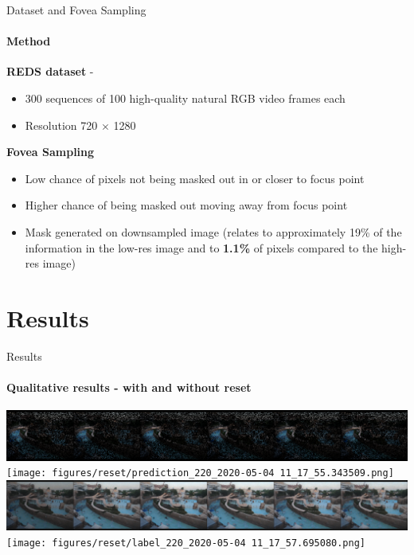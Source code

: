 \documentclass[
	ngerman,
	aspectratio=169,
	color={accentcolor=3d},
	logo=false,
	colorframetitle=true,
	]{tudabeamer}
\begin{document}
\begin{frame}{Dataset and Fovea Sampling}
\framesubtitle{Method}
\textbf{REDS dataset} - \citet{REDS}
\begin{itemize}
    \item 300 sequences of 100 high-quality natural RGB video frames each
    \item Resolution 720 $\times$ 1280
\end{itemize}
\textbf{Fovea Sampling}
\begin{itemize}
    \item Low chance of pixels not being masked out in or closer to focus point
    \item Higher chance of being masked out moving away from focus point
    \item Mask generated on downsampled image (relates to approximately 19\% of the information in the low-res image and to \textbf{1.1\%} of pixels compared to the high-res image)
\end{itemize}
\end{frame}


\section{Results}

\begin{frame}{Results}
    \framesubtitle{Qualitative results - with and without reset}
    \begin{center}
    \includegraphics[width=0.75\linewidth]{figures/reset/input_220_2020-05-04 11_17_59.593499.png}
    \texttt{[image: figures/reset/prediction\_220\_2020-05-04 11\_17\_55.343509.png]}
    \includegraphics[width=0.75\linewidth]{figures/no_rest/prediction_220_2020-05-06 09_57_18.378952.png}
    \texttt{[image: figures/reset/label\_220\_2020-05-04 11\_17\_57.695080.png]}
    \end{center}
\end{frame}
\end{document}
